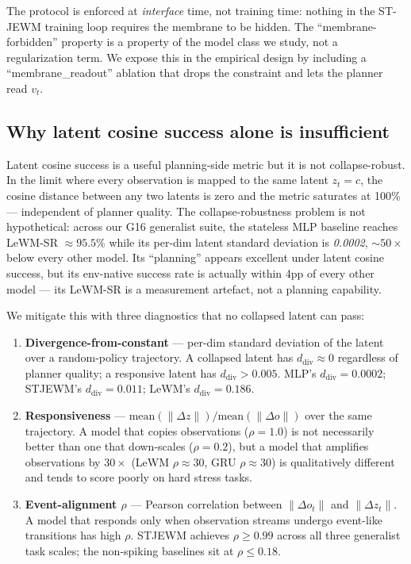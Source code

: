\documentclass{article}
\begin{document}
The protocol is enforced at \emph{interface} time, not training time: nothing in the ST-JEWM training loop requires the membrane to be hidden. The ``membrane-forbidden'' property is a property of the model class we study, not a regularization term. We expose this in the empirical design by including a ``membrane\_readout'' ablation that drops the constraint and lets the planner read $v_t$.

\subsection{Why latent cosine success alone is insufficient}

Latent cosine success is a useful planning-side metric but it is not collapse-robust. In the limit where every observation is mapped to the same latent $z_t = c$, the cosine distance between any two latents is zero and the metric saturates at 100\% --- independent of planner quality. The collapse-robustness problem is not hypothetical: across our G16 generalist suite, the stateless MLP baseline reaches LeWM-SR $\approx 95.5\%$ while its per-dim latent standard deviation is \emph{0.0002}, $\sim 50\times$ below every other model. Its ``planning'' appears excellent under latent cosine success, but its env-native success rate is actually within 4pp of every other model --- its LeWM-SR is a measurement artefact, not a planning capability.

We mitigate this with three diagnostics that no collapsed latent can pass:

\begin{enumerate}
\item \textbf{Divergence-from-constant} --- per-dim standard deviation of the latent over a random-policy trajectory. A collapsed latent has $d_{\mathrm{div}} \approx 0$ regardless of planner quality; a responsive latent has $d_{\mathrm{div}} > 0.005$. MLP's $d_{\mathrm{div}} = 0.0002$; STJEWM's $d_{\mathrm{div}} = 0.011$; LeWM's $d_{\mathrm{div}} = 0.186$.
\item \textbf{Responsiveness} --- $\mathrm{mean}(\|\Delta z\|) / \mathrm{mean}(\|\Delta o\|)$ over the same trajectory. A model that copies observations ($\rho = 1.0$) is not necessarily better than one that down-scales ($\rho = 0.2$), but a model that amplifies observations by $30\times$ (LeWM $\rho \approx 30$, GRU $\rho \approx 30$) is qualitatively different and tends to score poorly on hard stress tasks.
\item \textbf{Event-alignment $\rho$} --- Pearson correlation between $\|\Delta o_t\|$ and $\|\Delta z_t\|$. A model that responds only when observation streams undergo event-like transitions has high $\rho$. STJEWM achieves $\rho \geq 0.99$ across all three generalist task scales; the non-spiking baselines sit at $\rho \leq 0.18$.
\end{enumerate}
\end{document}
